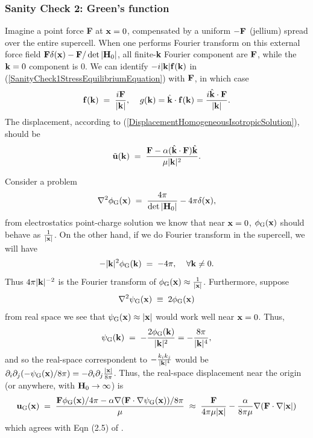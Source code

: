 \documentclass[12pt]{article}
\begin{document}
\subsubsection{Sanity Check 2: Green's function}

Imagine a point force {\bf F} at ${\bf x}=0$, compensated by a uniform
$-{\bf F}$ (jellium) spread over the entire supercell.  When one
performs Fourier transform on this external force field ${\bf
F}\delta({\bf x})-{\bf F}/\det|{\bf H}_0|$, all finite-{\bf k}
Fourier component are ${\bf F}$, while the ${\bf k}=0$ component is $0$.
We can identify $-i|{\bf k}|{\bf f}({\bf k})$ in
(\ref{SanityCheck1StressEquilibriumEquation}) with ${\bf F}$, in which
case
\begin{equation}
 {\bf f}({\bf k}) \;=\; \frac{i{\bf F}}{|{\bf k}|}, \;\;\;\; g({\bf
 k}) = \hat{\bf k}\cdot {\bf f}({\bf k}) = \frac{i\hat{\bf k}\cdot{\bf
 F}}{|{\bf k}|}.
\end{equation}
The displacement, according to
(\ref{DisplacementHomogeneousIsotropicSolution}), should be
\begin{equation}
 \tilde{\bf u}({\bf k}) \;=\; 
 \frac{{\bf F} - \alpha (\hat{\bf k}\cdot{\bf F})\hat{\bf k}}{\mu |{\bf k}|^2}.
\end{equation}

Consider a problem
\begin{equation}
  \nabla^2 \phi_{\rm G}({\bf x}) \;=\; 
  \frac{4\pi}{\det|{\bf H}_0|} - 4\pi\delta({\bf x}),
\end{equation}
from electrostatics point-charge solution we know
that near ${\bf x}=0$, $\phi_{\rm G}({\bf x})$ should behave as
$\frac{1}{|{\bf x}|}$.  On the other hand, if we do Fourier
transform in the supercell, we will have
\begin{equation}
 -|{\bf k}|^2 \phi_{\rm G}({\bf k}) \;=\; -4\pi, \;\;\;\;\forall {\bf k}\neq 0.
\end{equation}
Thus $4\pi|{\bf k}|^{-2}$ is the Fourier transform of $\phi_{\rm G}({\bf
x})\approx\frac{1}{|{\bf x}|}$.
Furthermore, suppose
\begin{equation}
  \nabla^2 \psi_{\rm G}({\bf x}) \;\equiv\;  2\phi_{\rm G}({\bf x})
\end{equation}
from real space we see that $\psi_{\rm G}({\bf x})\approx|{\bf x}|$ 
would work well near ${\bf x}=0$.  Thus,
\begin{equation}
 \psi_{\rm G}({\bf k}) \;=\; -\frac{2\phi_{\rm G}({\bf k})}{|{\bf k}|^2}
 = -\frac{8\pi}{|{\bf k}|^4},
\end{equation}
and so the real-space correspondent to $-\frac{k_ik_j}{|{\bf k}|^4}$
would be $\partial_i\partial_j(-\psi_{\rm G}({\bf x})/8\pi) =
-\partial_i\partial_j \frac{|{\bf x}|}{8\pi}$.  Thus, the real-space
displacement near the origin (or anywhere, with ${\bf
H}_0\rightarrow\infty$) is
\begin{equation}
 {\bf u}_{\rm G}({\bf x}) \;=\; \frac{{\bf F}\phi_{\rm G}({\bf
 x})/4\pi-\alpha\nabla({\bf F}\cdot\nabla\psi_{\rm G}({\bf x}))/8\pi}{\mu} 
 \;\approx\; \frac{{\bf
 F}}{4\pi\mu|{\bf x}|} - \frac{\alpha}{8\pi\mu}\nabla({\bf F}\cdot
 \nabla|{\bf x}|)
\end{equation}
which agrees with Eqn (2.5) of \cite{Eshelby57}.
\end{document}
